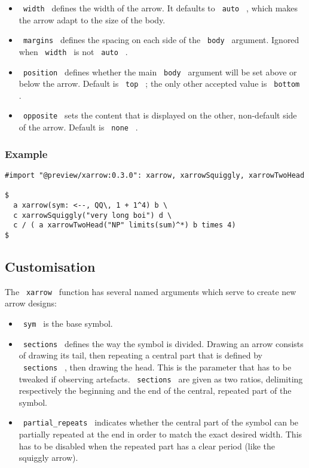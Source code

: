 \begin{itemize}
\tightlist
\item
  \texttt{\ width\ } defines the width of the arrow. It defaults to
  \texttt{\ auto\ } , which makes the arrow adapt to the size of the
  body.
\item
  \texttt{\ margins\ } defines the spacing on each side of the
  \texttt{\ body\ } argument. Ignored when \texttt{\ width\ } is not
  \texttt{\ auto\ } .
\item
  \texttt{\ position\ } defines whether the main \texttt{\ body\ }
  argument will be set above or below the arrow. Default is
  \texttt{\ top\ } ; the only other accepted value is
  \texttt{\ bottom\ } .
\item
  \texttt{\ opposite\ } sets the content that is displayed on the other,
  non-default side of the arrow. Default is \texttt{\ none\ } .
\end{itemize}

\subsubsection{Example}\label{example}

\begin{verbatim}
#import "@preview/xarrow:0.3.0": xarrow, xarrowSquiggly, xarrowTwoHead

$
  a xarrow(sym: <--, QQ\, 1 + 1^4) b \
  c xarrowSquiggly("very long boi") d \
  c / ( a xarrowTwoHead("NP" limits(sum)^*) b times 4)
$
\end{verbatim}

\subsection{Customisation}\label{customisation}

The \texttt{\ xarrow\ } function has several named arguments which serve
to create new arrow designs:

\begin{itemize}
\tightlist
\item
  \texttt{\ sym\ } is the base symbol.
\item
  \texttt{\ sections\ } defines the way the symbol is divided. Drawing
  an arrow consists of drawing its tail, then repeating a central part
  that is defined by \texttt{\ sections\ } , then drawing the head. This
  is the parameter that has to be tweaked if observing artefacts.
  \texttt{\ sections\ } are given as two ratios, delimiting respectively
  the beginning and the end of the central, repeated part of the symbol.
\item
  \texttt{\ partial\_repeats\ } indicates whether the central part of
  the symbol can be partially repeated at the end in order to match the
  exact desired width. This has to be disabled when the repeated part
  has a clear period (like the squiggly arrow).
\end{itemize}

